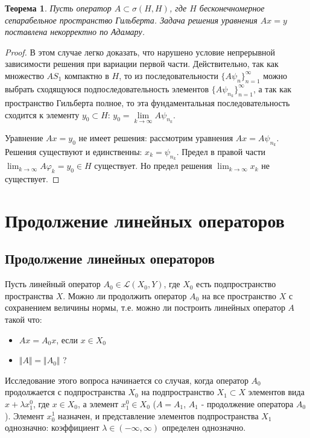 \documentclass[12pt,a4paper,titlepage,oneside]{book}
\theoremstyle{definition}
\theoremstyle{plain}
\newtheorem*{theorem}{Теорема}
\theoremstyle{remark}
\theoremstyle{remark}
\theoremstyle{remark}
\theoremstyle{remark}
\theoremstyle{plain}
\theoremstyle{plain}
\begin{document}
\begin{theorem}
Пусть оператор $A \subset \sigma (H,H)$, где $H$ бесконечномерное сепарабельное пространство Гильберта. Задача решения уравнения $Ax=y$ поставлена некорректно по Адамару.
\end{theorem}

\begin{proof}
В этом случае легко доказать, что нарушено условие непрерывной зависимости решения при вариации первой части. Действительно, так как множество $AS_1$ компактно в $H$, то из последовательности $\lbrace A \psi_n\rbrace_{n=1}^{\infty}$ можно выбрать сходящуюся подпоследовательность элементов $\lbrace A \psi_{n_k}\rbrace_{n=1}^{\infty}$, а так как пространство Гильберта полное, то эта фундаментальная последовательность сходится к элементу $y_0 \subset H$: $y_0=\underset{k \to \infty}{\lim} A \psi_{n_k}$.

Уравнение $Ax = y_0$ не имеет решения: рассмотрим уравнения $Ax = A \psi_{n_k}$. Решения существуют и единственны: $x_k = \psi_{n_k}$. Предел в правой части $\displaystyle\lim_{k \to \infty} A \varphi_k = y_0 \in H$ существует. Но предел решения $\displaystyle\lim_{k \to \infty} x_k$ не существует.
\end{proof}

\chapter{Продолжение линейных операторов}

\section{Продолжение линейных операторов}
Пусть линейный оператор $A_0\in \mathcal{L}(X_0,Y)$, где $X_0$ есть подпространство пространства $X$. Можно ли продолжить оператор $A_0$ на все пространство $X$ с сохранением величины нормы, т.е. можно ли построить линейных оператор $A$ такой что:
\begin{itemize}
 \item $Ax = A_0x$, если $x\in X_0$
 \item $\Vert A \Vert = \Vert A_0 \Vert$ ?
\end{itemize}


Исследование этого вопроса начинается со случая, когда оператор $A_0$ продолжается с подпространства $X_0$ на подпространство $X_1\subset X$ элементов вида $x+\lambda x_1^0$, где $x\in X_0$, а элемент $x_1^0 \in X_0$ ($A = A_1$, $A_1$ - продолжение оператора $A_0$). Элемент $x_0^1$ назначен, и представление элементов подпространства $X_1$ однозначно: коэффициент $\lambda \in (-\infty , \infty)$ определен однозначно. 
\end{document}
